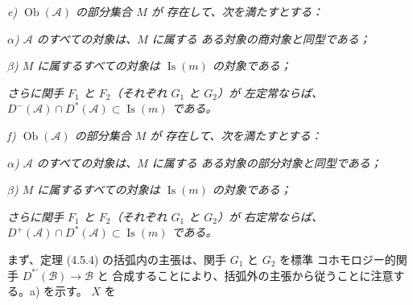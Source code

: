 \noindent\textit{e) $\operatorname{Ob}(\mathcal A)$ の部分集合 $M$ が
存在して、次を満たすとする：}

\noindent\textit{$\alpha$) $\mathcal A$ のすべての対象は、$M$ に属する
ある対象の商対象と同型である；}

\noindent\textit{$\beta$) $M$ に属するすべての対象は
$\operatorname{Is}(m)$ の対象である；}

\noindent\textit{さらに関手 $F_1$ と $F_2$（それぞれ $G_1$ と $G_2$）が
左定常ならば、
$D^-(\mathcal A)\cap D^*(\mathcal A)\subset\operatorname{Is}(m)$ である。}

\noindent\textit{f) $\operatorname{Ob}(\mathcal A)$ の部分集合 $M$ が
存在して、次を満たすとする：}

\noindent\textit{$\alpha$) $\mathcal A$ のすべての対象は、$M$ に属する
ある対象の部分対象と同型である；}

\noindent\textit{$\beta$) $M$ に属するすべての対象は
$\operatorname{Is}(m)$ の対象である；}

\noindent\textit{さらに関手 $F_1$ と $F_2$（それぞれ $G_1$ と $G_2$）が
右定常ならば、
$D^+(\mathcal A)\cap D^*(\mathcal A)\subset\operatorname{Is}(m)$ である。}

まず、定理 (4.5.4) の括弧内の主張は、関手 $G_1$ と $G_2$ を標準
コホモロジー的関手 $D^{*'}(\mathcal B)\longrightarrow\mathcal B$ と
合成することにより、括弧外の主張から従うことに注意する。a) を示す。
$X$ を
\endgroup
